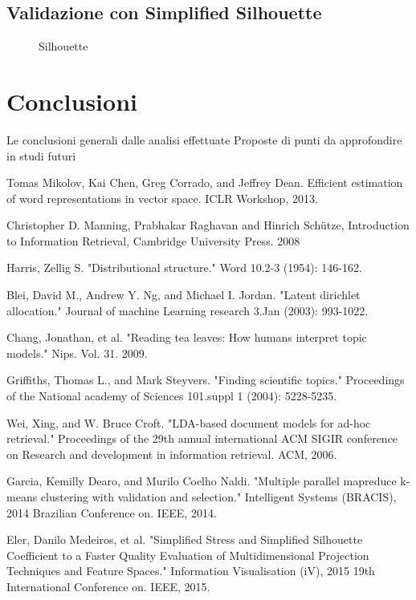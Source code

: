 \documentclass[
	11pt, %
	a4paper, %
	oneside, %
	headinclude,footinclude, %
	BCOR5mm, %
]{scrartcl}
\begin{document}
	\subsection{Validazione con Simplified Silhouette}
		\begin{figure}[!htb]
			\centering
			\caption{Silhouette}
			\label{fig:silhouette}
		\end{figure}

\section{Conclusioni}
	Le conclusioni generali dalle analisi effettuate
	Proposte di punti da approfondire in studi futuri


\begin{thebibliography}{12}

    Tomas Mikolov, Kai Chen, Greg Corrado, and Jeffrey Dean. Efficient estimation of word representations
    in vector space. ICLR Workshop, 2013.

	Christopher D. Manning, Prabhakar Raghavan and Hinrich Schütze, Introduction to Information Retrieval, Cambridge University Press. 2008

	Harris, Zellig S. "Distributional structure." Word 10.2-3 (1954): 146-162.

	Blei, David M., Andrew Y. Ng, and Michael I. Jordan. "Latent dirichlet allocation." Journal of machine Learning research 3.Jan (2003): 993-1022.

	Chang, Jonathan, et al. "Reading tea leaves: How humans interpret topic models." Nips. Vol. 31. 2009.
	
	Griffiths, Thomas L., and Mark Steyvers. "Finding scientific topics." Proceedings of the National academy of Sciences 101.suppl 1 (2004): 5228-5235.

Wei, Xing, and W. Bruce Croft. "LDA-based document models for ad-hoc retrieval." Proceedings of the 29th annual international ACM SIGIR conference on Research and development in information retrieval. ACM, 2006.

	Garcia, Kemilly Dearo, and Murilo Coelho Naldi. "Multiple parallel mapreduce k-means clustering with validation and selection." Intelligent Systems (BRACIS), 2014 Brazilian Conference on. IEEE, 2014.

	Eler, Danilo Medeiros, et al. "Simplified Stress and Simplified Silhouette Coefficient to a Faster Quality Evaluation of Multidimensional Projection Techniques and Feature Spaces." Information Visualisation (iV), 2015 19th International Conference on. IEEE, 2015.

\end{thebibliography}

\end{document}
